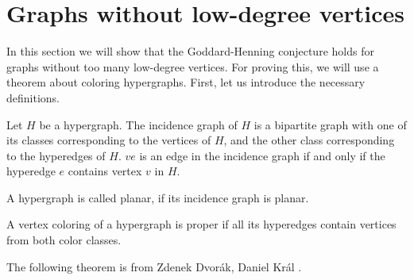 \section{Graphs without low-degree vertices}
In this section we will show that the Goddard-Henning conjecture holds for graphs
without too many low-degree vertices. For proving this, we will use a theorem
about coloring hypergraphs. First, let us introduce the necessary definitions.

\begin{definition}
  Let $H$ be a hypergraph. The incidence graph of $H$ is a bipartite graph with one of
  its classes corresponding to the vertices of $H$, and the other class corresponding to
  the hyperedges of $H$. $ve$ is an edge in the incidence graph if and only if the
  hyperedge $e$ contains vertex $v$ in $H$.
\end{definition}
\begin{definition}
  A hypergraph is called planar, if its incidence graph is planar.
\end{definition}
\begin{definition}
  A vertex coloring of a hypergraph is proper if all its hyperedges contain vertices
  from both color classes.
\end{definition}

The following theorem is from Zdenek Dvorák, Daniel Král \cite{hypergraph}.

